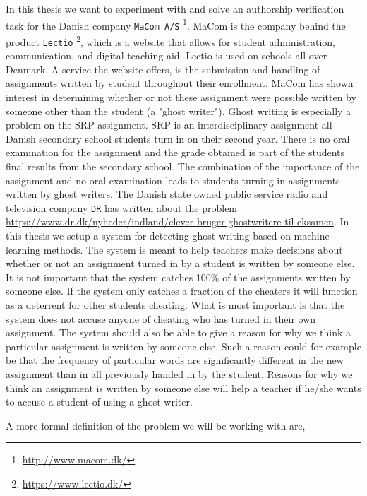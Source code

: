 
In this thesis we want to experiment with and solve an authorship
verification task for the Danish company \texttt{MaCom A/S}
\footnote{\url{http://www.macom.dk/}}. MaCom is the company behind the
product \texttt{Lectio} \footnote{\url{https://www.lectio.dk/}}, which is a
website that allows for student administration, communication, and digital
teaching aid. Lectio is used on schools all over Denmark. A service the
website offers, is the submission and handling of assignments written by
student throughout their enrollment. MaCom has shown interest in determining
whether or not these assignment were possible written by someone other than
the student (a "ghost writer"). Ghost writing is especially a problem on
the \gls{SRP} assignment. \gls{SRP} is an interdisciplinary assignment all
Danish secondary school students turn in on their second year. There is
no oral examination for the assignment and the grade obtained is part of
the students final results from the secondary school. The combination of
the importance of the assignment and no oral examination leads to students
turning in assignments written by ghost writers. The Danish state owned public
service radio and television company \texttt{DR} has written about the problem
\url{https://www.dr.dk/nyheder/indland/elever-bruger-ghostwritere-til-eksamen}.
In this thesis we setup a system for detecting ghost writing based on machine
learning methods. The system is meant to help teachers make decisions about
whether or not an assignment turned in by a student is written by someone else.
It is not important that the system catches 100\% of the assignments written by
someone else. If the system only catches a fraction of the cheaters it will
function as a deterrent for other students cheating. What is most important is
that the system does not accuse anyone of cheating who has turned in their own
assignment. The system should also be able to give a reason for why we think a
particular assignment is written by someone else. Such a reason could for
example be that the frequency of particular words are significantly different in
the new assignment than in all previously handed in by the student. Reasons for
why we think an assignment is written by someone else will help a teacher if
he/she wants to accuse a student of using a ghost writer.


A more formal definition of the problem we will be working with are,

